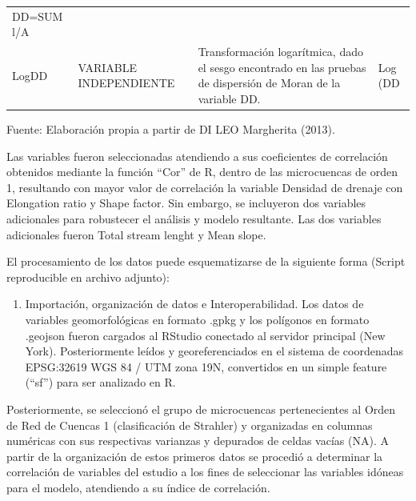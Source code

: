 \documentclass[11pt,]{article}
\providecommand{\tightlist}{%
\setlength{\itemsep}{0pt}\setlength{\parskip}{0pt}}
\begin{document}
\begin{longtable}[]{@{}llll@{}}
\begin{minipage}[t]{0.12\columnwidth}
DD=SUM l/A\strut
\end{minipage}\tabularnewline
\begin{minipage}[t]{0.08\columnwidth}\raggedright\strut
LogDD\strut
\end{minipage} & \begin{minipage}[t]{0.25\columnwidth}\raggedright\strut
VARIABLE INDEPENDIENTE\strut
\end{minipage} & \begin{minipage}[t]{0.44\columnwidth}\raggedright\strut
Transformación logarítmica, dado el sesgo encontrado en las pruebas de
dispersión de Moran de la variable DD.\strut
\end{minipage} & \begin{minipage}[t]{0.12\columnwidth}\raggedright\strut
Log (DD\strut
\end{minipage}\tabularnewline
\bottomrule
\end{longtable}

Fuente: Elaboración propia a partir de DI LEO Margherita (2013).

Las variables fueron seleccionadas atendiendo a sus coeficientes de
correlación obtenidos mediante la función ``Cor'' de R, dentro de las
microcuencas de orden 1, resultando con mayor valor de correlación la
variable Densidad de drenaje con Elongation ratio y Shape factor. Sin
embargo, se incluyeron dos variables adicionales para robustecer el
análisis y modelo resultante. Las dos variables adicionales fueron Total
stream lenght y Mean slope.

El procesamiento de los datos puede esquematizarse de la siguiente forma
(Script reproducible en archivo adjunto):

\begin{enumerate}
\def\labelenumi{\Roman{enumi}.}
\tightlist
\item
  Importación, organización de datos e Interoperabilidad. Los datos de
  variables geomorfológicas en formato .gpkg y los polígonos en formato
  .geojson fueron cargados al RStudio conectado al servidor principal
  (New York). Posteriormente leídos y georeferenciados en el sistema de
  coordenadas EPSG:32619 WGS 84 / UTM zona 19N, convertidos en un simple
  feature (``sf'') para ser analizado en R.
\end{enumerate}

Posteriormente, se seleccionó el grupo de microcuencas pertenecientes al
Orden de Red de Cuencas 1 (clasificación de Strahler) y organizadas en
columnas numéricas con sus respectivas varianzas y depurados de celdas
vacías (NA). A partir de la organización de estos primeros datos se
procedió a determinar la correlación de variables del estudio a los
fines de seleccionar las variables idóneas para el modelo, atendiendo a
su índice de correlación.
\end{document}
